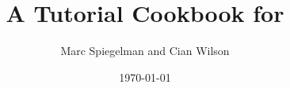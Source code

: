 


\makeatletter
\def\maketitle{%
  \null
  \thispagestyle{empty}%
  \vfill
  \begin{center}\leavevmode
    \normalfont
    {\LARGE\raggedleft \@author\par}%
    \hrulefill\par
    {\huge\raggedright \@title\par}%
    \vfill
    \texttt{[image: figures/3D\_Solitary\_Wave\_c5n3m0b\_cropped.png]}\\
    \vfill{}
    {\Large Version 1.0\par}%
    {\Large \@date\par}%
  \end{center}%
  \vfill
  \null
  \cleardoublepage
  }
\makeatother
\author{Marc Spiegelman and Cian Wilson}
\title{A Tutorial Cookbook for \TF{}}
\date{\today}

\pagestyle{ruled} %


\setcounter{tocdepth}{2}

\renewcommand{\sc}{}





